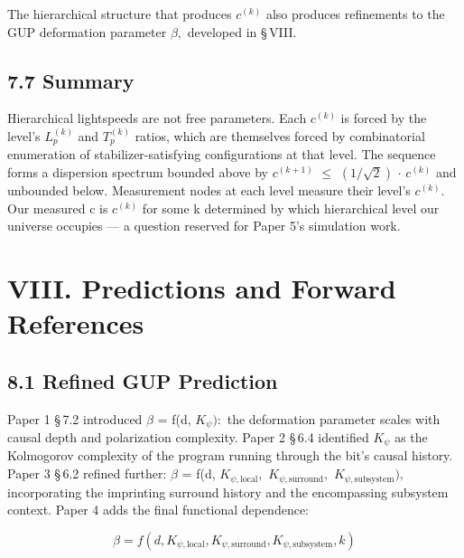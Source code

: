 \documentclass[11pt,oneside]{report}
\theoremstyle{definition}
\theoremstyle{remark}
\begin{document}
The hierarchical structure that produces \ensuremath{c^{(k)}} also produces
refinements to the GUP deformation parameter \ensuremath{\beta ,} developed in \S\,VIII.

\subsection*{7.7 Summary}

Hierarchical lightspeeds are not free parameters. Each \ensuremath{c^{(k)}} is
forced by the level's \ensuremath{L_{p}^{(k)}} and \ensuremath{T_{p}^{(k)}} ratios, which are
themselves forced by combinatorial enumeration of stabilizer-satisfying
configurations at that level. The sequence forms a dispersion spectrum
bounded above by \ensuremath{c^{(k+1)}} \ensuremath{\leq} \ensuremath{(1/\sqrt{2})} \ensuremath{\cdot} \ensuremath{c^{(k)}} and unbounded below.
Measurement nodes at each level measure their level's \ensuremath{c^{(k)}.} Our
measured c is \ensuremath{c^{(k)}} for some k determined by which hierarchical level
our universe occupies --- a question reserved for Paper 5's simulation
work.

\section*{VIII. Predictions and Forward References}

\subsection*{8.1 Refined GUP Prediction}

Paper 1 \S\,7.2 introduced \ensuremath{\beta} = f(d, \ensuremath{K_{\psi}):} the deformation parameter scales
with causal depth and polarization complexity. Paper 2 \S\,6.4 identified
\ensuremath{K_{\psi}} as the Kolmogorov complexity of the program running through the
bit's causal history. Paper 3 \S\,6.2 refined further: \ensuremath{\beta} = f(d,
\ensuremath{K_{\psi,\mathrm{local}},} \ensuremath{K_{\psi,\mathrm{surround}},} \ensuremath{K_{\psi,\mathrm{subsystem}}),} incorporating the
imprinting surround history and the encompassing subsystem context.
Paper 4 adds the final functional dependence:

\begin{equation*}
\beta = f(d, K_{\psi,\mathrm{local}}, K_{\psi,\mathrm{surround}}, K_{\psi,\mathrm{subsystem}}, k)
\end{equation*}
\end{document}
